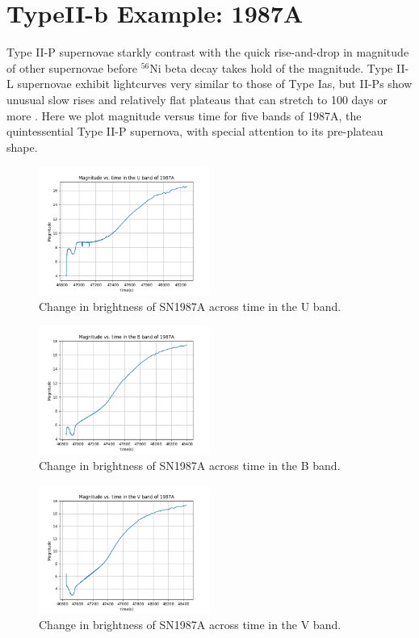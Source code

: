 \section{TypeII-b Example: 1987A}

Type II-P supernovae starkly contrast with the quick rise-and-drop in magnitude of other supernovae before $^{56}$Ni beta decay takes hold of the magnitude. Type II-L supernovae exhibit lightcurves very similar to those of Type Ias, but II-Ps show unusual slow rises and relatively flat plateaus that can stretch to 100 days or more \cite{nowakowski2018}. Here we plot magnitude versus time for five bands of 1987A, the quintessential Type II-P supernova, with special attention to its pre-plateau shape.

\begin{figure}[htp]
	\includegraphics[width=0.5\textwidth]{1987A_U_magvstime.png}
	\caption{Change in brightness of SN1987A across time in the U band.}
\end{figure}
\begin{figure}[htp]
	\includegraphics[width=0.5\textwidth]{1987A_B_magvstime.png}
	\caption{Change in brightness of SN1987A across time in the B band.}
\end{figure}
\begin{figure}[htp]
	\includegraphics[width=0.5\textwidth]{1987A_V_magvstime.png}
	\caption{Change in brightness of SN1987A across time in the V band.}
\end{figure}
